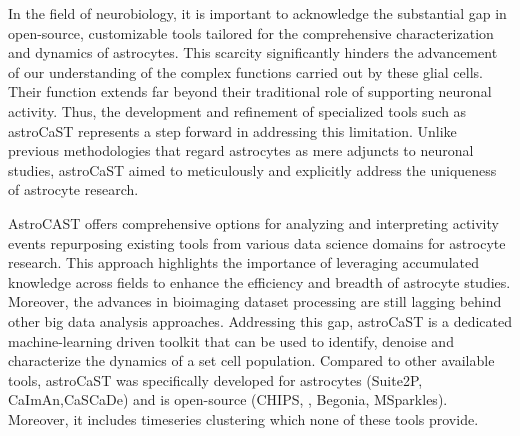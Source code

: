 In the field of neurobiology, it is important to acknowledge the substantial gap in open-source, customizable tools tailored for the comprehensive characterization and dynamics of astrocytes. This scarcity significantly hinders the advancement of our understanding of the complex functions carried out by these glial cells. Their function extends far beyond their traditional role of supporting neuronal activity\citep{montalant_role_2021,ransom_new_2003}. Thus, the development and refinement of specialized tools such as astroCaST represents a step forward in addressing this limitation. Unlike previous methodologies that regard astrocytes as mere adjuncts to neuronal studies, astroCaST aimed to meticulously and explicitly address the uniqueness of astrocyte research.

AstroCAST offers comprehensive options for analyzing and interpreting activity events repurposing existing tools from various data science domains for astrocyte research. This approach highlights the importance of leveraging accumulated knowledge across fields to enhance the efficiency and breadth of astrocyte studies. Moreover, the advances in bioimaging dataset processing are still lagging behind other big data analysis approaches. Addressing this gap, astroCaST is a dedicated machine-learning driven toolkit that can be used to identify, denoise and characterize the dynamics of a set cell population. Compared to other available tools, astroCaST was specifically developed for astrocytes (Suite2P\citep{pachitariu_suite2p_2017}, CaImAn\citep{giovannucci_caiman_2019},CaSCaDe\citep{rupprecht_database_2021}) and is open-source (CHIPS\citep{barrett_chips_2018}, \citep{wang_event-based_2018}, Begonia\citep{bjornstad_begoniatwo-photon_2021}, MSparkles\citep{stopper_novel_2022}). Moreover, it includes timeseries clustering which none of these tools provide.

